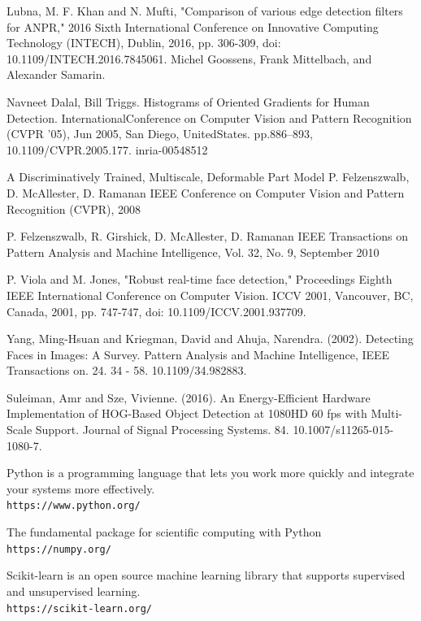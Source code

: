 \documentclass{article}
\begin{document}
\begin{thebibliography}{11}
Lubna, M. F. Khan and N. Mufti, "Comparison of various edge detection filters for ANPR," 2016 Sixth International Conference on Innovative Computing Technology (INTECH), Dublin, 2016, pp. 306-309, doi: 10.1109/INTECH.2016.7845061.
Michel Goossens, Frank Mittelbach, and Alexander Samarin. 

Navneet Dalal, Bill Triggs.  Histograms of Oriented Gradients for Human Detection.  InternationalConference on Computer Vision and Pattern Recognition (CVPR ’05), Jun 2005, San Diego, UnitedStates. pp.886–893, 10.1109/CVPR.2005.177. inria-00548512

A Discriminatively Trained, Multiscale, Deformable Part Model
P. Felzenszwalb, D. McAllester, D. Ramanan
IEEE Conference on Computer Vision and Pattern Recognition (CVPR), 2008 

P. Felzenszwalb, R. Girshick, D. McAllester, D. Ramanan
IEEE Transactions on Pattern Analysis and Machine Intelligence, Vol. 32, No. 9, September 2010 

P. Viola and M. Jones, "Robust real-time face detection," Proceedings Eighth IEEE International Conference on Computer Vision. ICCV 2001, Vancouver, BC, Canada, 2001, pp. 747-747, doi: 10.1109/ICCV.2001.937709.

Yang, Ming-Hsuan and Kriegman, David and Ahuja, Narendra. (2002). Detecting Faces in Images: A Survey. Pattern Analysis and Machine Intelligence, IEEE Transactions on. 24. 34 - 58. 10.1109/34.982883. 

Suleiman, Amr and Sze, Vivienne. (2016). An Energy-Efficient Hardware Implementation of HOG-Based Object Detection at 1080HD 60 fps with Multi-Scale Support. Journal of Signal Processing Systems. 84. 10.1007/s11265-015-1080-7. 

Python is a programming language that lets you work more quickly and integrate your systems more effectively.
\\\texttt{https://www.python.org/}

The fundamental package for scientific computing with Python
\\\texttt{https://numpy.org/}

Scikit-learn is an open source machine learning library that supports supervised and unsupervised learning. 
\\\texttt{https://scikit-learn.org/}

\end{thebibliography}
\end{document}
